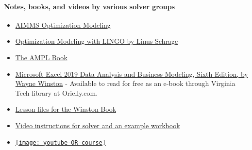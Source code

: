 \documentclass[letter,12pt]{book}
\renewcommand{\0}{\mathbf{0}}
\begin{document}
\paragraph{\textbf{Notes, books, and videos by various solver groups}}
\begin{itemize}
\item \href{https://www.aimms.com/english/developers/resources/manuals/optimization-modeling/}{AIMMS Optimization Modeling}
\item \href{https://www.lindo.com/index.php/ls-downloads?id=112:lingo-documentation&catid=82}{Optimization Modeling with LINGO by Linus Schrage} 
\item \href{https://ampl.com/resources/the-ampl-book/chapter-downloads/}{The AMPL Book}
\item \href{https://learning.oreilly.com/library/view/microsoft-excel-2019/9781509306091/?ar}{Microsoft Excel 2019 Data Analysis and Business Modeling, Sixth Edition, by Wayne Winston} - Available to read for free as an e-book through Virginia Tech library at Orielly.com.
\item \href{https://www.microsoftpressstore.com/store/microsoft-excel-2019-data-analysis-and-business-modeling-9781509305889}{Lesson files for the Winston Book}
\item \href{https://www.xelplus.com/excel-solver-example/}{Video instructions for solver and an example workbook}

\item \href{https://www.youtube.com/playlist?list=PLgA4wLGrqI-ll9OSJmR5nU4lV4_aNTgKx}
{\texttt{[image: youtube-OR-course]}}
\end{itemize}
\end{document}
